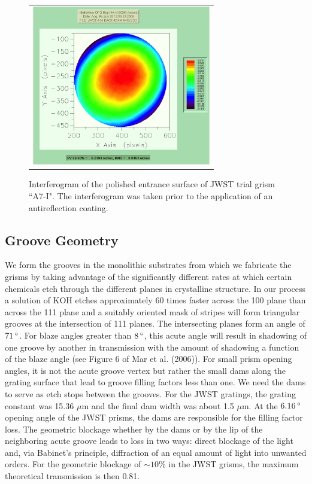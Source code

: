    \begin{figure}
   \begin{center}
   \begin{tabular}{c}
   \includegraphics[height=7cm]{chSPIE_2010_JWST/figs/A7I_entrance_uncoat.png}
   \end{tabular}
   \end{center}
   \caption[A7-I interferogram] {\label{fig:im2}  Interferogram of the polished entrance surface of JWST trial grism ``A7-I".  The interferogram was taken prior to the application of an antireflection coating. }
   \end{figure} 

\subsection{Groove Geometry}
We form the grooves in the monolithic substrates from which we fabricate the grisms by taking advantage of the significantly different rates at which certain chemicals etch through the different planes in crystalline structure\cite{Marsh07,Tsang1975}.  In our process a solution of KOH etches approximately 60 times faster across the 100 plane than across the 111 plane and a suitably oriented mask of stripes will form triangular grooves at the intersection of 111 planes.  The intersecting planes form an angle of $71\,^{\circ}{\rm}$.  For blaze angles greater than $8\,^{\circ}{\rm}$, this acute angle will result in shadowing of one groove by another in transmission with the amount of shadowing a function of the blaze angle (see Figure 6 of Mar et al. (2006)\cite{Mar06}).  For small prism opening angles, it is not the acute groove vertex but rather the small dams along the grating surface that lead to groove filling factors less than one.  We need the dams to serve as etch stops between the grooves.  For the JWST gratings, the grating constant was 15.36 $\mu$m and the final dam width was about 1.5 $\mu$m.  At the $6.16 \,^{\circ}{\rm}$ opening angle of the JWST prisms, the dams are responsible for the filling factor loss.  The geometric blockage whether by the dams or by the lip of the neighboring acute groove leads to loss in two ways:  direct blockage of the light and, via Babinet's principle, diffraction of an equal amount of light into unwanted orders.  For the geometric blockage of $\sim10\%$ in the JWST grisms, the maximum theoretical transmission is then 0.81.  

